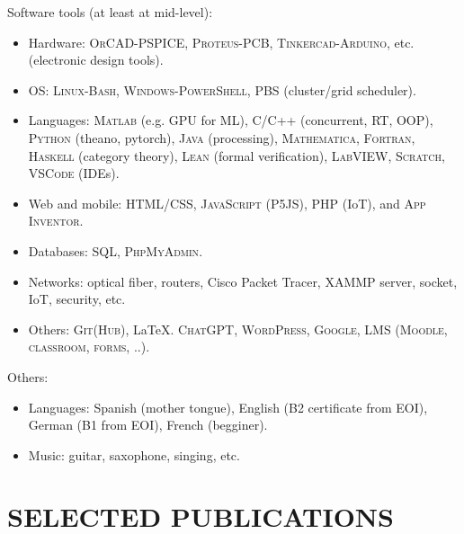 \documentclass[paper=a4,fontsize=11pt]{scrartcl} %
\newcommand{\NewPart}[1]{\section*{\uppercase{#1}}}
\begin{document}
\noindent Software tools (at least at mid-level):
\begin{itemize} 
 \item Hardware: \textsc{OrCAD-PSPICE, Proteus-PCB, Tinkercad-Arduino}, etc. (electronic design tools). 
 \item OS: \textsc{Linux-Bash, Windows-PowerShell}, \textsc{PBS} (cluster/grid scheduler).
 \item Languages: \textsc{Matlab} (e.g. GPU for ML), \textsc{C/C++} (concurrent, RT, OOP), \textsc{Python} (theano, pytorch), \textsc{Java} (processing),  \textsc{Mathematica}, \textsc{Fortran}, \textsc{Haskell} (category theory), \textsc{Lean} (formal verification), \textsc{LabVIEW, Scratch}, \textsc{VSCode} (IDEs). 
 \item Web and mobile:  \textsc{HTML/CSS, JavaScript (P5JS), PHP} (IoT), and \textsc{App Inventor}.
 \item Databases: \textsc{SQL, PhpMyAdmin}.
 \item Networks: optical fiber, routers, Cisco Packet Tracer, \textsc{XAMMP} server, socket, IoT, security, etc. 
 \item Others: \textsc{Git(Hub)}, \LaTeX. \textsc{ChatGPT, WordPress, Google}, \textsc{LMS (Moodle, classroom, forms, ..)}.
\end{itemize}

\noindent Others:
\begin{itemize}
 \item Languages: Spanish (mother tongue), English (B2 certificate from EOI), German (B1 from EOI), French (begginer).
 \item Music: guitar, saxophone, singing, etc.
\end{itemize}


\NewPart{Selected publications}{}


\end{document}
